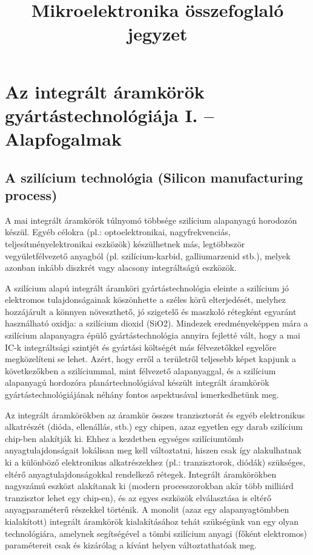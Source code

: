 \documentclass{article}
\title{Mikroelektronika összefoglaló jegyzet}
\begin{document}
\maketitle

\section{Az integrált áramkörök gyártástechnológiája I. – Alapfogalmak}
\subsection{A szilícium technológia (Silicon manufacturing process)}

A mai integrált áramkörök túlnyomó többsége szilícium alapanyagú horodozón készül.
Egyéb célokra (pl.: optoelektronikai, nagyfrekvenciás, teljesítményelektronikai eszközök)
készülhetnek más, legtöbbször vegyületfélvezető anyagból (pl. szilícium-karbid, galliumarzenid stb.), melyek azonban inkább diszkrét vagy alacsony integráltságú eszközök.

A szilícium alapú integrált áramköri gyártástechnológia eleinte a szilícium jó elektromos
tulajdonságainak köszönhette a széles körű elterjedését, melyhez hozzájárult a könnyen
növeszthető, jó szigetelő és maszkoló rétegként egyaránt használható oxidja: a szilícium
dioxid (SiO2). Mindezek eredményeképpen mára a szilícium alapanyagra épülő
gyártástechnológia annyira fejletté vált, hogy a mai IC-k integráltsági szintjét és gyártási
költségét más félvezetőkkel egyelőre megközelíteni se lehet. Azért, hogy erről a területről
teljesebb képet kapjunk a következőkben a szilíciummal, mint félvezető alapanyaggal, és a
szilícium alapanyagú hordozóra planártechnológiával készült integrált áramkörök
gyártástechnológiájának néhány fontos aspektusával ismerkedhetünk meg.

Az integrált áramkörökben az áramkör összes tranzisztorát és egyéb elektronikus
alkatrészét (dióda, ellenállás, stb.) egy chipen, azaz egyetlen egy darab szilícium chip-ben
alakítják ki. Ehhez a kezdetben egységes szilíciumtömb anyagtulajdonságait lokálisan meg
kell változtatni, hiszen csak így alakulhatnak ki a különböző elektronikus alkatrészekhez (pl.:
tranzisztorok, diódák) szükséges, eltérő anyagtulajdonságokkal rendelkező rétegek. Integrált
áramkörökben nagyszámú eszközt alakítanak ki (modern processzorokban akár több
milliárd tranzisztor lehet egy chip-en), és az egyes eszközök elválasztása is eltérő
anyagparaméterű részekkel történik. A monolit (azaz egy alapanyagtömbben kialakított)
integrált áramkörök kialakításához tehát szükségünk van egy olyan technológiára, amelynek
segítségével a tömbi szilícium anyagi (főként elektromos) paramétereit csak és kizárólag a
kívánt helyen változtathatóak meg.
\end{document}
